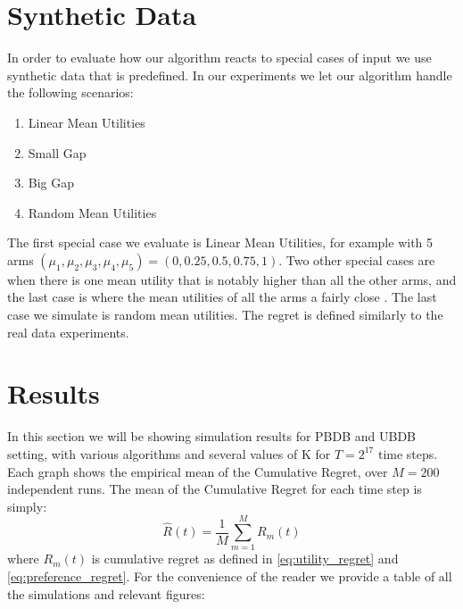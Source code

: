 \documentclass[MSc,beforeExam]{iitcsthesis}
\begin{document}
\section{Synthetic Data}
In order to evaluate how our algorithm reacts to special cases of input we use synthetic data that is predefined.
In our experiments we let our algorithm handle the following scenarios:
\begin{enumerate}
\item Linear Mean Utilities
\item Small Gap
\item Big Gap
\item Random Mean Utilities
\end{enumerate}
The first special case we evaluate is Linear Mean Utilities, for example with 5 arms $(\mu_1, \mu_2, \mu_3, \mu_4, \mu_5) = (0, 0.25, 0.5, 0.75, 1)$.
Two other special cases are when there is one mean utility that is notably higher than all the other arms, and the last case is where the mean utilities of all the arms a fairly close .
The last case we simulate is random mean utilities.
The regret is defined similarly to the real data experiments.

\newpage
\section{Results}
In this section we will be showing simulation results for PBDB and UBDB setting, with various algorithms and several values of K for $T = 2^{17}$ time steps. 
Each graph shows the empirical mean of the Cumulative Regret, over $M =200$ independent runs.
The mean of the Cumulative Regret for each time step is simply:
	\begin{equation}
	 \hat{R}(t) = \frac{1}{M}\sum_{m=1}^{M} R_m(t)
	\end{equation}
where $R_m(t)$ is cumulative regret as defined in \eqref{eq:utility_regret} and \eqref{eq:preference_regret}.
For the convenience of the reader we provide a table of all the simulations and relevant figures:
\end{document}
